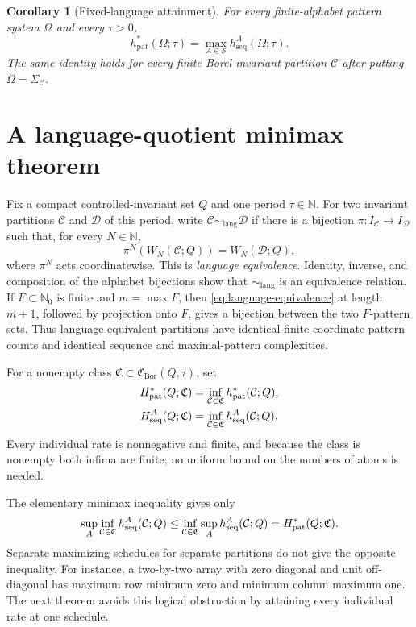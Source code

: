 \documentclass[11pt,reqno]{amsart}
\numberwithin{equation}{section}
\newtheorem{corollary}[theorem]{Corollary}
\theoremstyle{definition}
\newcommand{\N}{\mathbb N}
\newcommand{\Nzero}{\mathbb N_0}
\newcommand{\C}{\mathcal C}
\newcommand{\D}{\mathcal D}
\newcommand{\hseq}{h_{\mathrm{seq}}}
\newcommand{\hpat}{h_{\mathrm{pat}}^{*}}
\newcommand{\Bor}{\mathrm{Bor}}
\newcommand{\lang}{\mathrm{lang}}
\begin{document}
\begin{corollary}[Fixed-language attainment]\label{cor:fixed}
For every finite-alphabet pattern system $\Omega$ and every $\tau>0$,
\begin{equation}\label{eq:fixed-attainment}
 \hpat(\Omega;\tau)=\max_{A\in\mathscr S}\hseq^A(\Omega;\tau).
\end{equation}
The same identity holds for every finite Borel invariant partition $\C$ after
putting $\Omega=\Sigma_\C$.
\end{corollary}

\section{A language-quotient minimax theorem}\label{sec:minimax}

Fix a compact controlled-invariant set $Q$ and one period $\tau\in\N$.
For two invariant partitions $\C$ and $\D$ of this period, write
$\C\sim_{\lang}\D$ if there is a bijection
$\pi:I_\C\to I_\D$ such that, for every $N\in\N$,
\begin{equation}\label{eq:language-equivalence}
 \pi^N(W_N(\C;Q))=W_N(\D;Q),
\end{equation}
where $\pi^N$ acts coordinatewise.  This is \emph{language equivalence}.
Identity, inverse, and composition of the alphabet bijections show that
$\sim_{\lang}$ is an equivalence relation.  If $F\subset\Nzero$ is finite and
$m=\max F$, then \eqref{eq:language-equivalence} at length $m+1$, followed by
projection onto $F$, gives a bijection between the two $F$-pattern sets.
Thus language-equivalent partitions have identical finite-coordinate pattern
counts and identical sequence and maximal-pattern complexities.

For a nonempty class $\mathfrak C\subset\mathfrak C_{\Bor}(Q,\tau)$, set
\begin{align}
 H_{\rm pat}^*(Q;\mathfrak C)
 &=\inf_{\C\in\mathfrak C}\hpat(\C;Q),
 \label{eq:system-pattern}\\
 H_{\rm seq}^A(Q;\mathfrak C)
 &=\inf_{\C\in\mathfrak C}\hseq^A(\C;Q).
 \label{eq:system-sequence}
\end{align}
Every individual rate is nonnegative and finite, and because the class is nonempty both
infima are finite; no uniform bound on the numbers of atoms is needed.

The elementary minimax inequality gives only
\begin{align*}
 \sup_A\inf_{\C\in\mathfrak C}\hseq^A(\C;Q)
 \le\inf_{\C\in\mathfrak C}\sup_A\hseq^A(\C;Q)
 =H_{\rm pat}^*(Q;\mathfrak C).
\end{align*}
Separate maximizing schedules for separate partitions do not give the
opposite inequality. For instance, a two-by-two array with zero diagonal
and unit off-diagonal has maximum row minimum zero and minimum column
maximum one. The next theorem avoids this logical obstruction by
attaining every individual rate at one schedule.
\end{document}
